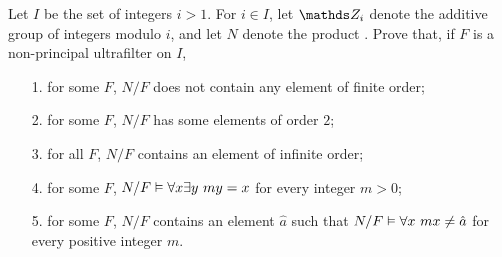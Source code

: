 \documentclass[creche.tex]{subfiles}
\begin{document}
\begin{exercise}
Let $I$ be the set of integers $i>1$. For $i\in I$, let $\ZZ_i$ denote the additive group of integers modulo $i$, and let $N$ denote the product . Prove that, if $F$ is a non-principal ultrafilter on $I$,

\begin{itemize}
\item[1.] for some $F$, $N/F$ does not contain any element of finite order;
\item[2.] for some $F$, $N/F$ has some elements of order $2$;
\item[3.] for all $F$, $N/F$ contains an element of infinite order;
\item[4.] for some $F$, $N/F\vDash \forall x\exists y\ my=x$ for every integer $m>0$;
\item[5.] for some $F$, $N/F$ contains an element $\hat a$ such that $N/F\vDash \forall x\ mx\neq\hat a$ for every positive integer $m$.\QED
\end{itemize}
\begin{comment}
\textbf{Soluzione.} Dimostriamo \ssf{1} osservando che $\ZZ_i\models\neg\E x\,[x\neq 0 \wedge mx=0]$  per ogni intero $m$ ed ogni primo $i\nmid m$. Quindi, se $F$ \`e un un ultrafiltro non principale che contiene l'insieme dei numeri primi, $N/F\models\neg\E x\,[x\neq 0 \wedge mx=0]$ per ogni $m$. Per dimostrare \ssf{2} osserviamo che $\ZZ_{2i}\models\E x\,[x\neq 0 \wedge 2x=0]$ per ogni $i$. Quindi se $F$ contiene l'insieme dei numeri pari, $N/F$ contiene un elemento di ordine 2. Per dimostrare \ssf{3} sia $\hat a\in N$ la sequenza che ha valore costante $1$. Chiaramente $\ZZ_i\models m\neq0$ per ogni intero positivo $m$ ed ogni $i>m$. Quindi, se $F$ contiene il filtro di Fr\'echet, $N/F\models m [\hat a]_F\neq 0$ per ogni intero positivo $m$. Dimostriamo \ssf{4} osservando che  $\ZZ_i\models\A x\,\E y\ my=x$ per ogni intero $m$ ed ogni primo $i\nmid m$. Quindi se $F$ \`e un ultrafiltro non principale che contiene l'insieme dei numeri primi,  $N/F\models\A x\,\E y\ my=x$ per ogni $m$. Dimostriamo \ssf{5}. Sia $F$ un ultrafiltro non principale che contiene l'insieme $\{i\,!:i\in I\}$ e sia $\hat a$ la sequenza che ha valore costante $1$. Poich\'e $\ZZ_{i\,!}\models\neg\E x\ mx=1$ per ogni $i>m$, otteniamo $N/F\models\neg\E x\ mx=[\hat a]_F$ per ogni $m>1$.
\end{comment}
\end{exercise}
\end{document}
